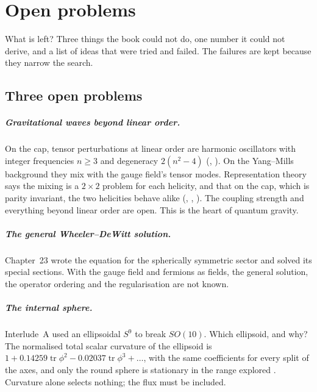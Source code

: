 \chapter{Open problems}\label{ch:open}

\begin{questionbox}
What is left? Three things the book could not do, one number it could not derive, and a list of ideas that were tried and failed. The failures are kept because they narrow the search.
\end{questionbox}

\section{Three open problems}

\paragraph{Gravitational waves beyond linear order.} On the cap, tensor perturbations at linear order are harmonic oscillators with integer frequencies $n\ge3$ and degeneracy $2(n^2-4)$ (, ). On the Yang--Mills background they mix with the gauge field's tensor modes. Representation theory says the mixing is a $2\times2$ problem for each helicity, and that on the cap, which is parity invariant, the two helicities behave alike (, , ). The coupling strength and everything beyond linear order are open. This is the heart of quantum gravity. \open

\paragraph{The general Wheeler--DeWitt solution.} Chapter~23 wrote the equation for the spherically symmetric sector and solved its special sections. With the gauge field and fermions as fields, the general solution, the operator ordering and the regularisation are not known. \open

\paragraph{The internal sphere.} Interlude~A used an ellipsoidal $S^9$ to break $SO(10)$. Which ellipsoid, and why? The normalised total scalar curvature of the ellipsoid is $1+0.14259\operatorname{tr}\phi^2-0.02037\operatorname{tr}\phi^3+\dots$, with the same coefficients for every split of the axes, and only the round sphere is stationary in the range explored \numerical. Curvature alone selects nothing; the flux must be included. \open

